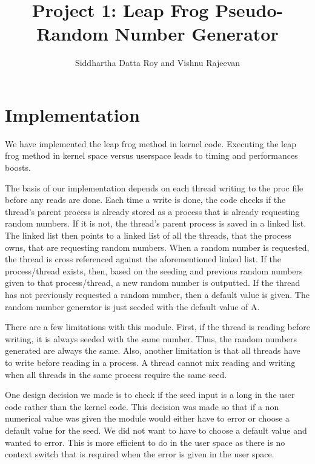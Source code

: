 \documentclass[12pt]{article}
\begin{document}
\title{Project 1: Leap Frog Pseudo-Random Number Generator}
\author{Siddhartha Datta Roy and Vishnu Rajeevan}
\maketitle
\newpage
\section*{Implementation}
	We have implemented the leap frog method in kernel code.
	Executing the leap frog method in kernel space versus userspace leads to timing and performances boosts.

	The basis of our implementation depends on each thread writing to the proc file before any reads are done.
	Each time a write is done, the code checks if the thread's parent process is already stored as a process that is already requesting random numbers.
	If it is not, the thread's parent process is saved in a linked list.
	The linked list then points to a linked list of all the threads, that the process owns, that are requesting random numbers.
	When a random number is requested, the thread is cross referenced against the aforementioned linked list.
	If the process/thread exists, then, based on the seeding and previous random numbers given to that process/thread, a new random number is outputted.
	If the thread has not previously requested a random number, then a default value is given. 
	The random number generator is just seeded with the default value of A.

	There are a few limitations with this module. First, if the thread is reading before writing, it is always seeded with the same number. 
	Thus, the random numbers generated are always the same.
	Also, another limitation is that all threads have to write before reading in a process.
	A thread cannot mix reading and writing when all threads in the same process require the same seed.

	One design decision we made is to check if the seed input is a long in the user code rather than the kernel code.
	This decision was made so that if a non numerical value was given the module would either have to error or choose a default value for the seed.
	We did not want to have to choose a default value and wanted to error. 
	This is more efficient to do in the user space as there is no context switch that is required when the error is given in the user space.
\end{document}
